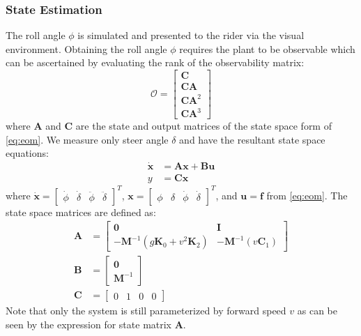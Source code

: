 \documentclass[11pt,a4paper,reqno]{amsart}
\newcommand{\mass}{\bm{M}}
\newcommand{\damping}{v \bm{C}_1}
\newcommand{\stiffness}{g \bm{K}_0 + v^2 \bm{K}_2}
\newcommand{\dstate}{\dot{\bm{x}}}
\newcommand{\state}{\bm{x}}
\newcommand{\sysInput}{\bm{u}}
\newcommand{\sysOutput}{y}
\newcommand{\stateMat}{\bm{A}}
\newcommand{\inputMat}{\bm{B}}
\newcommand{\outputMat}{\bm{C}}
\begin{document}
\subsubsection{State Estimation}
The roll angle $ \phi $ is simulated and presented to the rider via the visual environment.
Obtaining the roll angle $ \phi $ requires the plant to be observable which can be ascertained by evaluating the rank of
the observability matrix:
\begin{equation}
    \bm{\mathcal{O}} = \begin{bmatrix} \outputMat \\ \outputMat\stateMat \\
                                       \outputMat\stateMat^2 \\ \outputMat\stateMat^3 \end{bmatrix}
\end{equation}
where $ \bm{A} $ and $ \bm{C} $ are the state and output matrices of the state space form of \autoref{eq:eom}.
We measure only steer angle $ \delta $ and have the resultant state space equations:
\begin{equation}
\begin{aligned}
    \dstate &= \stateMat \state + \inputMat \sysInput \\
    \sysOutput &= \outputMat \state \label{eq:ss}
\end{aligned}
\end{equation}
where $ \dot{\bm{x}} = \begin{bmatrix} \dot{\phi} & \dot{\delta} & \ddot{\phi} & \ddot{\delta} \end{bmatrix}^T $,
$ \bm{x} = \begin{bmatrix} \phi & \delta & \dot{\phi} & \dot{\delta} \end{bmatrix}^T $,
and $ \bm{u} = \bm{f} $ from \autoref{eq:eom}.
The state space matrices are defined as:
\begin{equation}
\begin{aligned}
    \stateMat &= \begin{bmatrix} \bm{0} & \bm{I} \\
                -\mass^{-1} (\stiffness) & -\mass^{-1} (\damping) \end{bmatrix} \\
    \inputMat &= \begin{bmatrix} \bm{0} \\ \mass^{-1} \end{bmatrix} \\
    \outputMat &= \begin{bmatrix} 0 & 1 & 0 & 0 \end{bmatrix}
\end{aligned}
\end{equation}
Note that only the system is still parameterized by forward speed $ v $  as can be seen by the expression for
state matrix $ \stateMat $.
\end{document}

